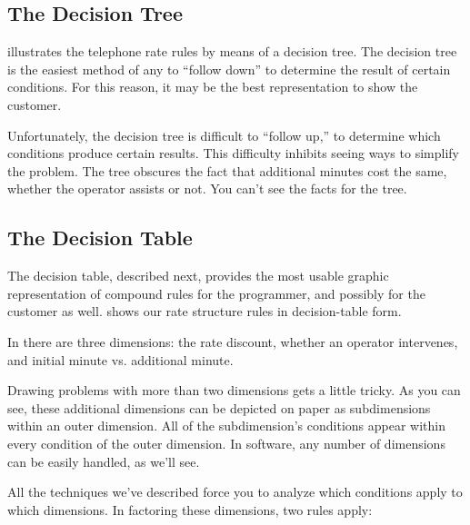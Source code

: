 \subsection{The Decision Tree}%
%


 illustrates the telephone rate rules by means of a
decision tree.  The decision tree is the easiest method of any to
``follow down'' to determine the result of certain conditions. For
this reason, it may be the best representation to show the customer.

Unfortunately, the decision tree is difficult to ``follow up,'' to
determine which conditions produce certain results. This difficulty
inhibits seeing ways to simplify the problem. The tree obscures the
fact that additional minutes cost the same, whether the operator
assists or not. You can't see the facts for the tree.%
%



\subsection{The Decision Table}%
%

The decision table, described next, provides the most usable graphic
representation of compound rules for the programmer, and possibly for
the customer as well.  shows our rate structure rules in
decision-table form.


In  there are three dimensions: the rate discount, whether
an operator intervenes, and initial minute vs. additional minute.

Drawing problems with more than two dimensions gets a little tricky.
As you can see, these additional dimensions can be depicted on
paper as subdimensions within an outer dimension. All of the
subdimension's conditions appear within every condition of the outer
dimension.  In software, any number of dimensions can be easily
handled, as we'll see.

All the techniques we've described force you to analyze which
conditions apply to which dimensions. In factoring these dimensions,
two rules apply:

